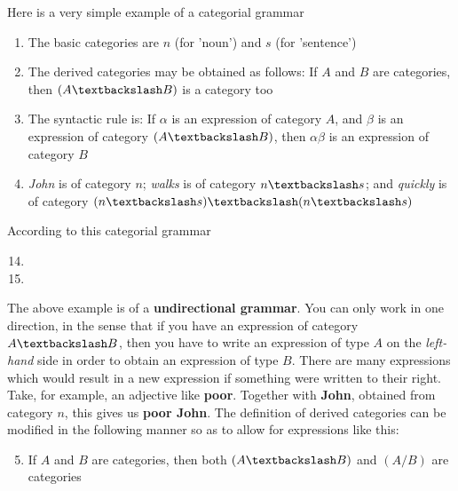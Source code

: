 \documentclass[11pt]{article}
\begin{document}
Here is a very simple example of a categorial grammar
\begin{enumerate}
\item The basic categories are \(n\) (for 'noun') and \(s\) (for 'sentence')
\item The derived categories may be obtained as follows: If \(A\) and \(B\) are
categories, then \((A\textbackslash B)\) is a category too
\item The syntactic rule is: If \(\alpha\) is an expression of category \(A\), and \(\beta\) is
an expression of category \((A\textbackslash B)\), then \(\alpha\beta\) is an
expression of category \(B\)
\item \emph{John} is of category \(n\); \emph{walks} is of category \(n\textbackslash s\); and
\emph{quickly} is of category \((n\textbackslash s)\textbackslash(n\textbackslash s)\)
\end{enumerate}


According to this categorial grammar
\begin{enumerate}
\setcounter{enumi}{13}
\item {}
\item {}
\end{enumerate}


The above example is of a \textbf{undirectional grammar}. You can only work in one
direction, in the sense that if you have an expression of category
\(A\textbackslash B\), then you have to write an expression of type \(A\) on the
\emph{left-hand} side in order to obtain an expression of type \(B\). There are
many expressions which would result in a new expression if something were
written to their right. Take, for example, an adjective like \textbf{poor}. Together
with \textbf{John}, obtained from category \(n\), this gives us \textbf{poor John}. The
definition of derived categories can be modified in the following manner so
as to allow for expressions like this:
\begin{enumerate}
\setcounter{enumi}{4}
\item If \(A\) and \(B\) are categories, then both \((A\textbackslash B)\) and
\((A/B)\) are categories
\end{enumerate}
\end{document}
